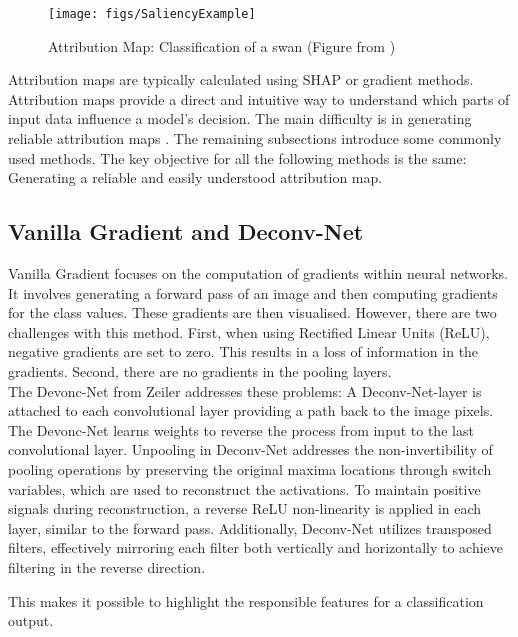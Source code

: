 \begin{figure}[H]
	\centering
	\texttt{[image: figs/SaliencyExample]}
	\caption[Attribution Map]{Attribution Map: Classification of a swan (Figure from \cite{captum})}
	\label{fig:saliency}
\end{figure}

Attribution maps are typically calculated using SHAP\cite{lundberg2017unified} or gradient methods. Attribution maps provide a direct and intuitive way to understand which parts of input data influence a model's decision. The main difficulty is in generating reliable attribution maps \cite{Kindermans2019}. The remaining subsections introduce some commonly used methods. The key objective for all the following methods is the same: Generating a reliable and easily understood attribution map.

\subsection{Vanilla Gradient and Deconv-Net}

Vanilla Gradient \cite{simonyan2014deep} focuses on the computation of gradients within neural networks. It involves generating a forward pass of an image and then computing gradients for the class values. These gradients are then visualised. However, there are two challenges with this method. First, when using Rectified Linear Units (ReLU), negative gradients are set to zero. This results in a loss of information in the gradients. Second, there are no gradients in the pooling layers.
\\
The Devonc-Net from Zeiler \cite{zeiler2013visualizing} addresses these problems:
A Deconv-Net-layer \cite{Zeiler2011AdaptiveDN} is attached to each convolutional layer providing a path back to the image pixels. The Devonc-Net learns weights to reverse the process from input to the last convolutional layer. Unpooling in Deconv-Net addresses the non-invertibility of pooling operations by preserving the original maxima locations through switch variables, which are used to reconstruct the activations. To maintain positive signals during reconstruction, a reverse ReLU non-linearity is applied in each layer, similar to the forward pass. Additionally, Deconv-Net utilizes transposed filters, effectively mirroring each filter both vertically and horizontally to achieve filtering in the reverse direction.

This makes it possible to highlight the responsible features for a classification output.

